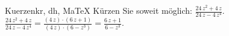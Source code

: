 \begin{MAufgabe}{Kuerzen}{kr, dh, MaTeX}
K\"urzen Sie soweit m\"oglich: $\frac{24\, z^2 + 4\, z}{24\, z - 4\, z^4}$.\\ 
\ifLsg\MLoesung
\quad $\frac{24\, z^2 + 4\, z}{24\, z - 4\, z^4}=\frac{(4\, z)\cdot(6\, z + 1)}{(4\, z)\cdot(6 - z^3)}=\frac{6\, z + 1}{6 - z^3}$.\else\relax\fi
 \end{MAufgabe}
